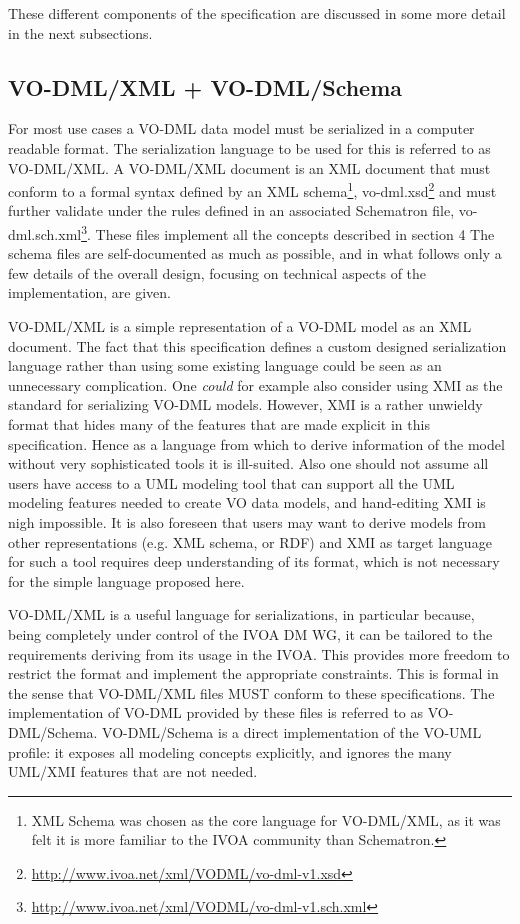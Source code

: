\documentclass[10pt,a4paper]{ivoa}
\begin{document}
These different components of the specification are discussed in some
more detail in the next subsections.

\hypertarget{vo-dmlxml-vo-dmlschema}{%
\subsection{VO-DML/XML + VO-DML/Schema}\label{vo-dmlxml-vo-dmlschema}}

For most use cases a VO-DML data model must be serialized in a computer
readable format. The serialization language to be used for this is
referred to as VO-DML/XML. A VO-DML/XML document is an XML document that
must conform to a formal syntax defined by an XML schema\footnote{XML
  Schema was chosen as the core language for VO-DML/XML, as it was felt
  it is more familiar to the IVOA community than Schematron.},
vo-dml.xsd\footnote{\url{http://www.ivoa.net/xml/VODML/vo-dml-v1.xsd}}
and must further validate under the rules defined in an associated
Schematron file, vo-dml.sch.xml\footnote{\url{http://www.ivoa.net/xml/VODML/vo-dml-v1.sch.xml}}.
These files implement all the concepts described in section 4 The schema
files are self-documented as much as possible, and in what follows only
a few details of the overall design, focusing on technical aspects of
the implementation, are given.

VO-DML/XML is a simple representation of a VO-DML model as an XML
document. The fact that this specification defines a custom designed
serialization language rather than using some existing language could be
seen as an unnecessary complication. One \emph{could} for example also
consider using XMI as the standard for serializing VO-DML models.
However, XMI is a rather unwieldy format that hides many of the features
that are made explicit in this specification. Hence as a language from
which to derive information of the model without very sophisticated
tools it is ill-suited. Also one should not assume all users have access
to a UML modeling tool that can support all the UML modeling features
needed to create VO data models, and hand-editing XMI is nigh
impossible. It is also foreseen that users may want to derive models
from other representations (e.g. XML schema, or RDF) and XMI as target
language for such a tool requires deep understanding of its format,
which is not necessary for the simple language proposed here.

VO-DML/XML is a useful language for serializations, in particular
because, being completely under control of the IVOA DM WG, it can be
tailored to the requirements deriving from its usage in the IVOA. This
provides more freedom to restrict the format and implement the
appropriate constraints. This is formal in the sense that VO-DML/XML
files MUST conform to these specifications. The implementation of VO-DML
provided by these files is referred to as VO-DML/Schema. VO-DML/Schema
is a direct implementation of the VO-UML profile: it exposes all
modeling concepts explicitly, and ignores the many UML/XMI features that
are not needed.
\end{document}
